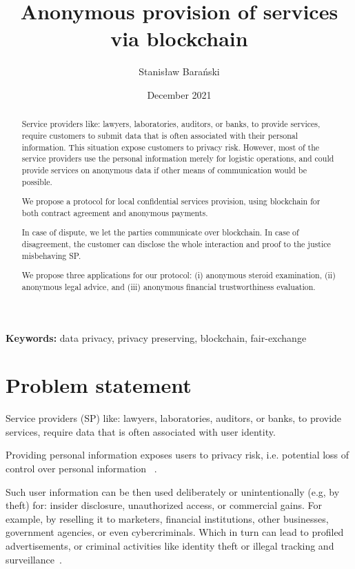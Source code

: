 \documentclass{article}
\title{Anonymous provision of services via blockchain}
\author{Stanisław Barański}
\date{December 2021}
\providecommand{\keywords}[1]{\textbf{Keywords:} #1}
\begin{document}
\maketitle

\begin{abstract}
Service providers like: lawyers, laboratories, auditors, or banks, to provide services, require customers to submit data that is often associated with their personal information. This situation expose customers to privacy risk. However, most of the service providers use the personal information merely for logistic operations, and could provide services on anonymous data if other means of communication would be possible.

We propose a protocol for local confidential services provision, using blockchain for both contract agreement and anonymous payments.

In case of dispute, we let the parties communicate over blockchain. In case of disagreement, the customer can disclose the whole interaction and proof to the justice misbehaving SP.

We propose three applications for our protocol: (i) anonymous steroid examination, (ii) anonymous legal advice, and (iii) anonymous financial trustworthiness evaluation.

\end{abstract}
\keywords{data privacy, privacy preserving, blockchain, fair-exchange}



\section{Problem statement}
Service providers (SP) like: lawyers, laboratories, auditors, or banks, to provide services, require data that is often associated with user identity.

Providing personal information exposes users to privacy risk, i.e. potential loss of control over personal information ~\cite{smith2011information}. 

Such user information can be then used deliberately or unintentionally (e.g, by theft) for: insider disclosure, unauthorized access, or commercial gains. For example, by reselling it to marketers, financial institutions, other businesses, government agencies, or even cybercriminals. Which in turn can lead to profiled advertisements, or criminal activities like identity theft or illegal tracking and surveillance~\cite{smith2011information}.
\end{document}
